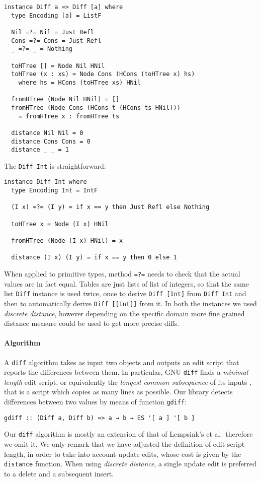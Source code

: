 \documentclass{sigplanconf}
\theoremstyle{plain}
\begin{document}
\begin{verbatim}
instance Diff a => Diff [a] where	
  type Encoding [a] = ListF

  Nil =?= Nil = Just Refl
  Cons =?= Cons = Just Refl
  _ =?= _ = Nothing

  toHTree [] = Node Nil HNil
  toHTree (x : xs) = Node Cons (HCons (toHTree x) hs)
    where hs = HCons (toHTree xs) HNil

  fromHTree (Node Nil HNil) = []
  fromHTree (Node Cons (HCons t (HCons ts HNil))) 
    = fromHTree x : fromHTree ts

  distance Nil Nil = 0
  distance Cons Cons = 0
  distance _ _ = 1
\end{verbatim} 
%
The \texttt{Diff Int} is straightforward:
\begin{verbatim}
instance Diff Int where
  type Encoding Int = IntF

  (I x) =?= (I y) = if x == y then Just Refl else Nothing
  
  toHTree x = Node (I x) HNil
  
  fromHTree (Node (I x) HNil) = x

  distance (I x) (I y) = if x == y then 0 else 1
\end{verbatim}
When applied to primitive types, method \texttt{=?=} needs to check that the
actual values are in fact equal.
%
Tables are just lists of list of integers, so that the same list
\texttt{Diff} instance is used twice, once to derive \texttt{Diff
  [Int]} from \texttt{Diff Int} and then to automatically derive
\texttt{Diff [[Int]]} from it.
%
In both the instances we used \emph{discrete distance}, however
depending on the specific domain more fine grained distance measure
could be used to get more precise diffs.

\paragraph{Algorithm}
A  \texttt{diff} algorithm takes as input two objects and outputs an
edit script that reports the differences between them.
%
In particular, GNU \texttt{diff} finds a \emph{minimal length} edit
script, or equivalently the \emph{longest common subsequence} of its
inputs \cite{Berg00, PierceDiff3}, that is a script which 
copies as many lines as possible.
%
Our library detects differences between two values by means of function \texttt{gdiff}:
\begin{verbatim}
gdiff :: (Diff a, Diff b) => a → b → ES '[ a ] '[ b ]
\end{verbatim}
%
Our \texttt{diff} algorithm is mostly an extension of that of
Lempsink's et al.\ therefore we omit it.
%
We only remark that we have adjusted the definition of edit script length,
in order to take into account update edits, whose cost is given
by the \texttt{distance} function.
%
When using \emph{discrete distance}, a single update edit is preferred
to a delete and a subsequent insert.
%
\end{document}
